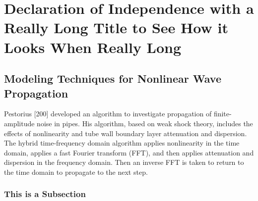 \chapter{Declaration of Independence with a Really Long Title to See How it Looks When Really Long} \label{chapter1:introduction}

\section{\sloppy Modeling Techniques for Nonlinear Wave Propagation}
Pestorius [200] developed an algorithm to investigate propagation of finite-am\-pli\-tude noise in pipes. His algorithm, based on weak shock theory, includes the effects of nonlinearity and tube wall boundary layer attenuation and dispersion. The hybrid time-frequency domain algorithm applies nonlinearity in the time domain, applies a fast Fourier transform (FFT), and then applies attenuation and dispersion in the frequency domain.  Then an inverse FFT is taken to return to the time domain to propagate to the next step.

\subsection{This is a Subsection}

